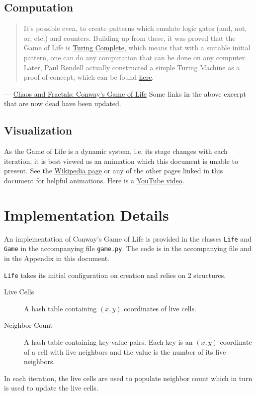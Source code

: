 \documentclass[addpoints]{exam}
\begin{document}
\subsection{Computation}
\begin{quotation}
  It's possible even, to create patterns which emulate logic gates (and, not, or, etc.) and counters. Building up from these, it was proved that the Game of Life is \href{https://simple.wikipedia.org/wiki/Turing_complete}{Turing Complete}, which means that with a suitable initial pattern, one can do any computation that can be done on any computer. Later, Paul Rendell actually constructed a simple Turing Machine as a proof of concept, which can be found \href{https://www.ics.uci.edu/~welling/teaching/271fall09/Turing-Machine-Life.pdf}{here}.
\end{quotation}
\raggedleft --- \href{http://pi.math.cornell.edu/~lipa/mec/lesson6.html}{Chaos and Fractals: Conway's Game of Life}
\justify
Some links in the above excerpt that are now dead have been updated.

\subsection{Visualization}

As the Game of Life is a dynamic system, i.e. its stage changes with each iteration, it is best viewed as an animation which this document is unable to present. See the \href{https://en.wikipedia.org/wiki/Conway's_Game_of_Life}{Wikipedia page} or any of the other pages linked in this document for helpful animations. Here is a \href{https://www.youtube.com/watch?v=C2vgICfQawE}{YouTube video}.

\section{Implementation Details}

An implementation of Conway's Game of Life is provided in the classes \texttt{Life} and \texttt{Game} in the accompanying file \texttt{game.py}. The code is in the accompanying file and in the Appendix in this document.

\texttt{Life} takes its initial configuration on creation and relies on 2 structures.
\begin{description}
\item[Live Cells]  A hash table containing $(x,y)$ coordinates of live cells.
\item[Neighbor Count] A hash table containing key-value pairs. Each key is an $(x,y)$ coordinate of a cell with live neighbors and the value is the number of its live neighbors.
\end{description}
In each iteration, the live cells are used to populate neighbor count which in turn is used to update the live cells.
\end{document}
